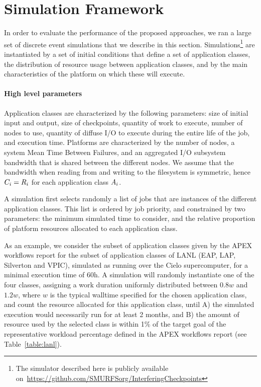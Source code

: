 
\section{Simulation Framework}
\label{sec:simulator}

In order to evaluate the performance of the proposed approaches, we
ran a large set of discrete event simulations that we describe in this
section. Simulations\footnote{The simulator described here is publicly
  available
  on~\url{https://github.com/SMURFSorg/InterferingCheckpoints}} are
instantiated by a set of initial conditions that define a set of
application classes, the distribution of resource usage between
application classes, and by the main characteristics of the platform
on which these will execute.

\paragraph*{High level parameters}
Application classes are characterized by the following parameters:
size of initial input and output, size of checkpoints, quantity of
work to execute, number of nodes to use, quantity of diffuse I/O to
execute during the entire life of the job, and execution time.
Platforms are characterized by the number of nodes, a system Mean Time
Between Failures, and an aggregated I/O subsystem bandwidth that is
shared between the different nodes. We assume that the bandwidth when
reading from and writing to the filesystem is symmetric, hence
$C_{i}=R_{i}$ for each application class $A_{i}$.

A simulation first selects randomly a list of jobs that are instances
of the different application classes. This list is ordered by job
priority, and constrained by two parameters: the minimum simulated
time to consider, and the relative proportion of platform resources
allocated to each application class.

As an example, we consider the subset of application classes given by
the APEX workflows report for the subset of application classes of
LANL (EAP, LAP, Silverton and VPIC), simulated as running over the
Cielo supercomputer, for a minimal execution time of 60h. A simulation
will randomly instantiate one of the four classes, assigning a work
duration uniformly distributed between $0.8w$ and $1.2w$, where $w$ is
the typical walltime specified for the chosen application class, and
count the resource allocated for this application class, until A) the
simulated execution would necessarily run for at least 2 months, and B) the
amount of resource used by the selected class is within 1\% of the
target goal of the representative workload percentage defined in the
APEX workflows report (see Table~\ref{table:lanl}).

